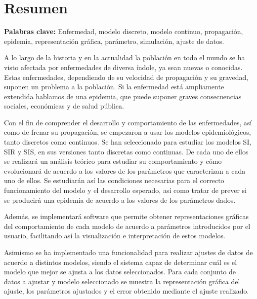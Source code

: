 

\chapter*{Resumen}

\textbf{Palabras clave: } Enfermedad, modelo discreto, modelo continuo, propagación, epidemia, representación gráfica, parámetro, simulación, ajuste de datos.

A lo largo de la historia y en la actualidad la población en todo el mundo se ha visto afectada por enfermedades de diversa índole, ya sean nuevas o conocidas. Estas enfermedades, dependiendo de su velocidad de propagación y su gravedad, suponen un problema a la población. Si la enfermedad está ampliamente extendida hablamos de una epidemia, que puede suponer graves consecuencias sociales, económicas y de salud pública.

Con el fin de comprender el desarrollo y comportamiento de las enfermedades, así como de frenar su propagación, se empezaron a usar los modelos epidemiológicos, tanto discretos como continuos. Se han seleccionado para estudiar los modelos SI, SIR y SIS, en sus versiones tanto discretas como continuas. De cada uno de ellos se realizará un análisis teórico para estudiar su comportamiento y cómo evolucionará de acuerdo a los valores de los parámetros que caracterizan a cada uno de ellos. Se estudiarán así las condiciones necesarias para el correcto funcionamiento del modelo y el desarrollo esperado, así como tratar de prever si se producirá una epidemia de acuerdo a los valores de los parámetros dados.

Además, se implementará software que permite obtener representaciones gráficas del comportamiento de cada modelo de acuerdo a parámetros introducidos por el usuario, facilitando así la visualización e interpretación de estos modelos.

Asimismo se ha implementado una funcionalidad para realizar ajustes de datos de acuerdo a distintos modelos, siendo el sistema capaz de determinar cuál es el modelo que mejor se ajusta a los datos seleccionados. Para cada conjunto de datos a ajustar y modelo seleccionado se muestra la representación gráfica del ajuste, los parámetros ajustados y el error obtenido mediante el ajuste realizado.

